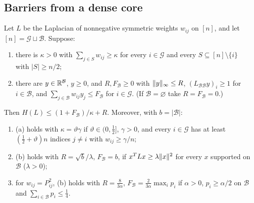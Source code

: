 \subsection{Barriers from a dense core}

\begin{lemma}\label{lem:core}
Let $L$ be the Laplacian of nonnegative symmetric weights $w_{ij}$ on $[n]$,
and let $[n]=\mathcal G\sqcup\mathcal B$. Suppose:
\begin{enumerate}[label=(\alph*)]
\item there is $\kappa>0$ with $\sum_{j\in S}w_{ij}\ge\kappa$ for every
$i\in\mathcal G$ and every $S\subseteq[n]\setminus\{i\}$ with $|S|\ge n/2$;
\item there are $y\in\mathbb R^{\mathcal B}$, $y\ge0$, and $R,F_{\mathcal B}\ge0$ with
$\lVert y\rVert_\infty\le R$, $(L_{\mathcal B\mathcal B}y)_i\ge1$ for $i\in\mathcal B$,
and $\sum_{j\in\mathcal B}w_{ij}y_j\le F_{\mathcal B}$ for $i\in\mathcal G$.
(If $\mathcal B=\varnothing$ take $R=F_{\mathcal B}=0$.)
\end{enumerate}
Then $H(L)\le(1+F_{\mathcal B})/\kappa+R$. Moreover, with $b=|\mathcal B|$:
\begin{enumerate}[label=(\roman*)]
\item (a) holds with $\kappa=\vartheta\gamma$ if $\vartheta\in(0,\frac12]$,
$\gamma>0$, and every $i\in\mathcal G$ has at least $(\frac12+\vartheta)n$ indices
$j\ne i$ with $w_{ij}\ge\gamma/n$;
\item (b) holds with $R=\sqrt b/\lambda$, $F_{\mathcal B}=b$, if
$x^TLx\ge\lambda\lVert x\rVert^2$ for every $x$ supported on $\mathcal B$ ($\lambda>0$);
\item for $w_{ij}=P_{ij}^2$, (b) holds with $R=\frac8{3\alpha}$,
$F_{\mathcal B}=\frac2{3\alpha}\max_ip_i$ if $\alpha>0$, $p_i\ge\alpha/2$ on
$\mathcal B$ and $\sum_{i\in\mathcal B}p_i\le\frac14$.
\end{enumerate}
\end{lemma}

